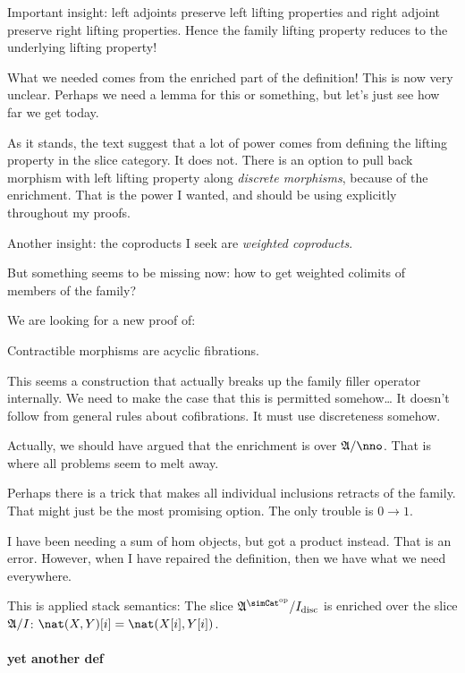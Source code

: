 \documentclass[csh.tex]{subfiles}
\begin{document}
Important insight: left adjoints preserve left lifting properties and right adjoint preserve right lifting properties. 
Hence the family lifting property reduces to the underlying lifting property!

What we needed comes from the enriched part of the definition! This is now very unclear.
Perhaps we need a lemma for this or something, but let's just see how far we get today.

As it stands, the text suggest that a lot of power comes from defining the lifting property in the slice category. It does not. 
There is an option to pull back morphism with left lifting property along \emph{discrete morphisms}, because of the enrichment. 
That is the power I wanted, and should be using explicitly throughout my proofs.

Another insight: the coproducts I seek are \emph{weighted coproducts}.

But something seems to be missing now: how to get weighted colimits of members of the family?

We are looking for a new proof of:
\begin{lemma} Contractible morphisms are acyclic fibrations.\end{lemma}
This seems a construction that actually breaks up the family filler operator internally.
We need to make the case that this is permitted somehow\dots
It doesn't follow from general rules about cofibrations. It must use discreteness somehow.

Actually, we should have argued that the enrichment is over $\ambient/\nno$.
That is where all problems seem to melt away.

Perhaps there is a trick that makes all individual inclusions retracts of the family. 
That might just be the most promising option.
The only trouble is $0\to 1$.


I have been needing a sum of hom objects, but got a product instead.
That is an error. However, when I have repaired the definition, then we have what we need everywhere.

This is applied stack semantics:
The slice $\ambient\s/I\disc$ is enriched over the slice $\mathfrak A/I$: $\nat(X,Y)[i] = \nat(X[i],Y[i])$.

\paragraph{yet another def}
\end{document}
